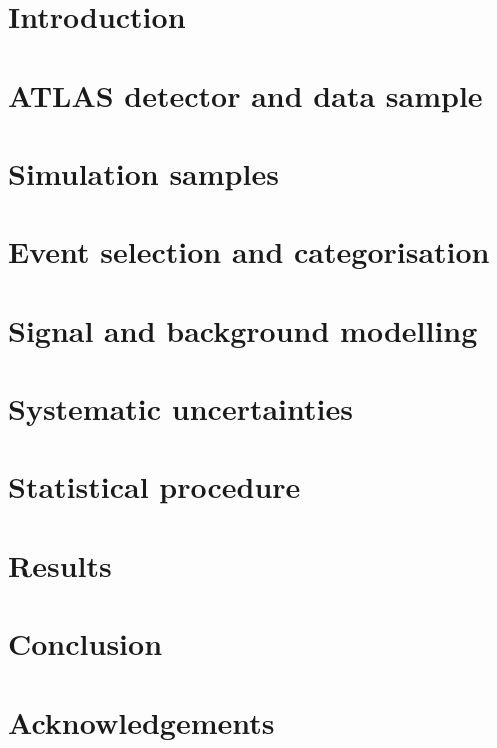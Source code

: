 \documentclass[cernpreprint,texlive=2016,txfonts,subfigure=true,texmf,UKenglish]{atlasdoc}
\begin{document}
\maketitle

\tableofcontents

\section{Introduction}
\label{sec:intro}


\section{ATLAS detector and data sample}
\label{sec:samples}


\section{Simulation samples}
\label{sec:mcsamples}


\section{Event selection and categorisation}
\label{sec:eventSelection}


\section{Signal and background modelling}
\label{sec:signalBkgModel}



\section{Systematic uncertainties}
\label{sec:sys}


\section{Statistical procedure}
\label{sec:statistics}


\section{Results}
\label{sec:result}


\FloatBarrier

\section{Conclusion}
\label{sec:conclusion}


\section*{Acknowledgements}
\label{sec:acknowledgements}


\printbibliography

\newpage

\end{document}
